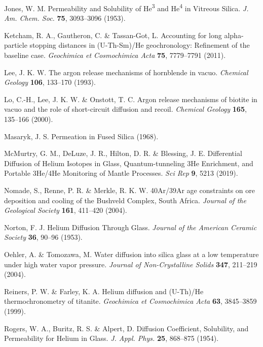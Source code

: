 \documentclass[gchron, manuscript]{copernicus}
\begin{document}
\begin{thebibliography}{}
Jones, W. M. Permeability and Solubility of He\textsuperscript{3} and He\textsuperscript{4} in Vitreous Silica. \emph{J. Am. Chem. Soc.} \textbf{75}, 3093--3096 (1953).

Ketcham, R. A., Gautheron, C. \& Tassan-Got, L. Accounting for long alpha-particle stopping distances in (U-Th-Sm)/He geochronology: Refinement of the baseline case. \emph{Geochimica et Cosmochimica Acta} \textbf{75}, 7779--7791 (2011).

Lee, J. K. W. The argon release mechanisms of hornblende in vacuo. \emph{Chemical Geology} \textbf{106}, 133--170 (1993).

Lo, C.-H., Lee, J. K. W. \& Onstott, T. C. Argon release mechanisms of biotite in vacuo and the role of short-circuit diffusion and recoil. \emph{Chemical Geology} \textbf{165}, 135--166 (2000).

Masaryk, J. S. Permeation in Fused Silica (1968).

McMurtry, G. M., DeLuze, J. R., Hilton, D. R. \& Blessing, J. E. Differential Diffusion of Helium Isotopes in Glass, Quantum-tunneling 3He Enrichment, and Portable 3He/4He Monitoring of Mantle Processes. \emph{Sci Rep} \textbf{9}, 5213 (2019).

Nomade, S., Renne, P. R. \& Merkle, R. K. W. 40Ar/39Ar age constraints on ore deposition and cooling of the Bushveld Complex, South Africa. \emph{Journal of the Geological Society} \textbf{161}, 411--420 (2004).

Norton, F. J. Helium Diffusion Through Glass. \emph{Journal of the American Ceramic Society} \textbf{36}, 90--96 (1953).

Oehler, A. \& Tomozawa, M. Water diffusion into silica glass at a low temperature under high water vapor pressure. \emph{Journal of Non-Crystalline Solids} \textbf{347}, 211--219 (2004).

Reiners, P. W. \& Farley, K. A. Helium diffusion and (U-Th)/He thermochronometry of titanite. \emph{Geochimica et Cosmochimica Acta} \textbf{63}, 3845--3859 (1999).

Rogers, W. A., Buritz, R. S. \& Alpert, D. Diffusion Coefficient, Solubility, and Permeability for Helium in Glass. \emph{J. Appl. Phys.} \textbf{25}, 868--875 (1954).


\end{thebibliography}
\end{document}
